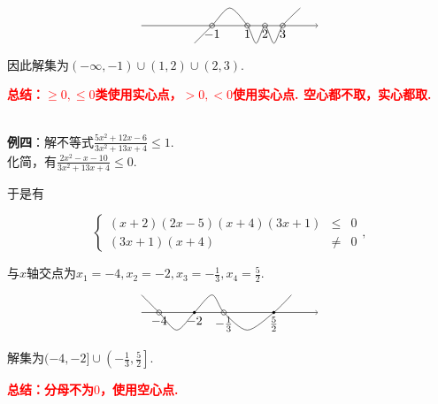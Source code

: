 \documentclass[8pt]{article}
\begin{document}
					$$
					\begin{tikzpicture}[scale=0.5]
				    		\draw[black, ->] (-5, 0)--(5, 0);
				    		\draw[black] (-1, 0) circle (4pt) node[anchor=north] {$-1$};
				    		\draw[black] ( 1, 0) circle (4pt) node[anchor=north] {$1$};
				    		\draw[black] ( 2, 0) circle (4pt) node[anchor=north] {$2$};
				    		\draw[black] ( 3, 0) circle (4pt) node[anchor=north] {$3$};
				    		\draw[black] plot [smooth] coordinates {(4, 1) (3, 0) (2.5, -1) (2, 0) (1.5, -1) (1, 0) (0, 1) (-1, 0) (-2, -1)};
				    	\end{tikzpicture}
					$$

					因此解集为$(-\infty, -1) \cup (1, 2) \cup (2, 3).$

					\textcolor{red}{\textbf{总结：$\geq 0, \leq 0$类使用实心点，$>0, <0$使用实心点. 空心都不取，实心都取.}}

				~\\

				\textbf{例四}：解不等式$\displaystyle \frac{5x^2+12x-6}{3x^2+13x+4} \leq 1.$
					~\\

					化简，有$\displaystyle \frac{2x^2-x-10}{3x^2+13x+4} \leq 0$.

					于是有

					$$
					\left\{
					\begin{array}{rcl}
						(x+2)(2x-5)(x+4)(3x+1)&\leq&0\\
						(3x+1)(x+4)&\neq&0
					\end{array}
					\right.,
					$$

					与$x$轴交点为$x_1=-4, x_2=-2, x_3=-\frac{1}{3}, x_4=\frac{5}{2}.$

					$$
					\begin{tikzpicture}[scale=0.5]
				    		\draw[black, ->] (-5, 0)--(5, 0);
				    		\draw[black] (-4, 0) circle (4pt) node[anchor=north] {$-4$};
				    		\filldraw[black] (-2, 0) circle (2pt) node[anchor=north] {$-2$};
				    		\draw[black] (-1/3, 0) circle (4pt) node[anchor=north] {$-\frac{1}{3}$};
				    		\filldraw[black] (5/2, 0) circle (2pt) node[anchor=north] {$\frac{5}{2}$};
				    		\draw[black] plot [smooth] coordinates {(7/2, 1) (5/2, 0) (1, -1) (-1/3, 0) (-1, 1) (-2, 0) (-3, -1) (-4, 0) (-5, 1)};
				    	\end{tikzpicture}
					$$

					解集为$(-4, -2]\cup\left(-\frac{1}{3}, \frac{5}{2}\right].$

					\textcolor{red}{\textbf{总结：分母不为$0$，使用空心点.}}
\end{document}
